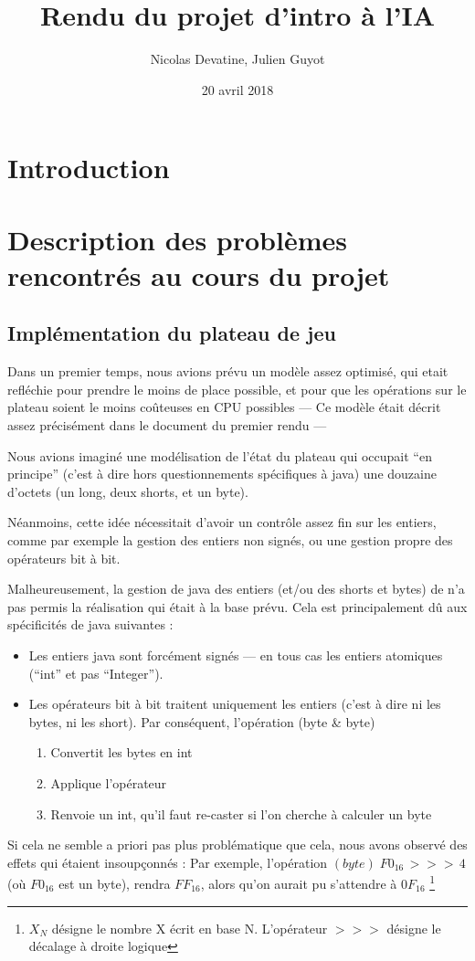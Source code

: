 \documentclass{article}
\author{Nicolas Devatine, Julien Guyot}
\title{Rendu du projet d'intro à l'IA}
\date{20 avril 2018}
\begin{document}
\maketitle
\section{Introduction}

\section{Description des problèmes rencontrés au cours du projet}
\subsection{Implémentation du plateau de jeu}
Dans un premier temps, nous avions prévu un modèle assez
optimisé, qui etait refléchie pour prendre le moins de place possible,
et pour que les opérations sur le plateau soient le moins coûteuses en
CPU possibles --- Ce modèle était décrit assez précisément dans le
document du premier rendu ---


Nous avions imaginé une modélisation de l'état du plateau qui occupait
``en principe'' (c'est à dire hors questionnements spécifiques à java)
une douzaine d'octets (un long, deux shorts, et un byte). 


Néanmoins, cette idée nécessitait d'avoir un contrôle assez fin sur les
entiers, comme par exemple la gestion des entiers non signés, ou une
gestion propre des opérateurs bit à bit.


Malheureusement, la gestion de java des entiers (et/ou des shorts et bytes) de n'a
pas permis la réalisation qui était à la base prévu. Cela est
principalement dû aux spécificités de java suivantes :
\begin{itemize}
\item Les entiers java sont forcément signés --- en tous cas les
  entiers atomiques (``int'' et pas ``Integer'').
\item Les opérateurs bit à bit traitent uniquement les entiers
  (c'est à dire ni les bytes, ni les short). Par conséquent,
  l'opération (byte \& byte)
  \begin{enumerate}
  \item Convertit les bytes en int 
  \item Applique l'opérateur 
  \item Renvoie un int, qu'il faut re-caster si l'on cherche à calculer un byte
  \end{enumerate}
 \end{itemize}
Si cela ne semble a priori pas plus problématique que cela, 
nous avons observé des effets qui étaient
insoupçonnés : Par exemple, l'opération
\((byte)  \; F0_{16} \, >>> \,4 \)  (o\`u \(F0_{16} \) est un byte), rendra
\( FF_{16} \), alors qu'on aurait pu s'attendre à \( 0F_{16} \)
\footnote{ \(X_{N}\) désigne le
  nombre X écrit en base N. L'opérateur \(>>>\) désigne le décalage à
  droite logique}
\end{document}
